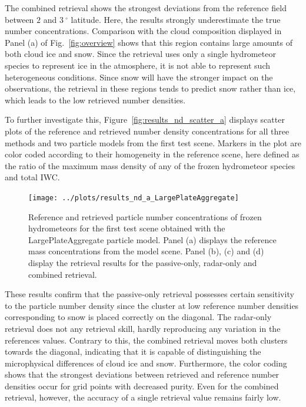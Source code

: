 \documentclass[journal abbreviation, manuscript]{copernicus}
\begin{document}
The combined retrieval shows the strongest deviations from the reference field
between $2$ and $3\ \unit{^\circ}$ latitude. Here, the results strongly
underestimate the true number concentrations. Comparison with the cloud
composition displayed in Panel (a) of Fig.~\ref{fig:overview} shows that this
region contains large amounts of both cloud ice and snow. Since the retrieval
uses only a single hydrometeor species to represent ice in the atmosphere, it is
not able to represent such heterogeneous conditions. Since snow will have the
stronger impact on the observations, the retrieval in these regions tends to
predict snow rather than ice, which leads to the low retrieved number densities.

To further investigate this, Figure~\ref{fig:results_nd_scatter_a} displays
scatter plots of the reference and retrieved number density concentrations for
all three methods and two particle models from the first test scene. Markers in
the plot are color coded according to their homogeneity in the reference scene,
here defined as the ratio of the maximum mass density of any of the frozen
hydrometeor species and total IWC. 

\begin{figure}
\centering
\texttt{[image: ../plots/results\_nd\_a\_LargePlateAggregate]}
\caption{Reference and retrieved particle number concentrations of frozen
  hydrometeors for the first test scene obtained with the LargePlateAggregate
  particle model. Panel (a) displays the reference mass concentrations from the
  model scene. Panel (b), (c) and (d) display the retrieval results for the
  passive-only, radar-only and combined retrieval.}
\label{fig:results_nd_a}
\end{figure}

These results confirm that the passive-only retrieval possesses certain
sensitivity to the particle number density since the cluster at low reference
number densities corresponding to snow is placed correctly on the diagonal. The
radar-only retrieval does not any retrieval skill, hardly reproducing any
variation in the references values. Contrary to this, the combined retrieval
moves both clusters towards the diagonal, indicating that it is capable of
distinguishing the microphysical differences of cloud ice and snow. Furthermore,
the color coding shows that the strongest deviations between retrieved and
reference number densities occur for grid points with decreased purity. Even
for the combined retrieval, however, the accuracy of a single retrieval value
remains fairly low.
\end{document}
